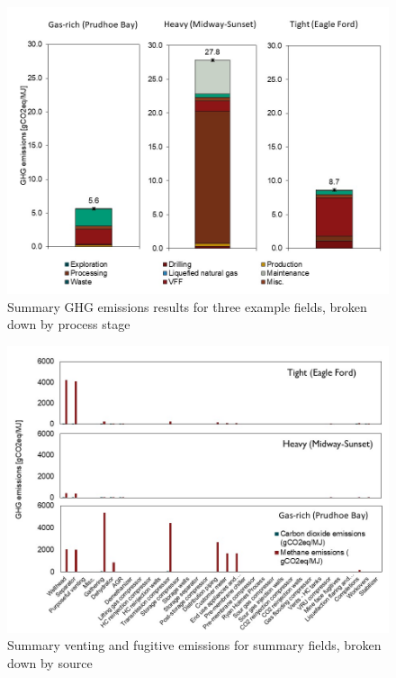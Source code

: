 \documentclass[11pt]{report}
\begin{document}
\begin{figure}[!htbp]
\includegraphics[width=1\columnwidth]{documentation/images/User_Guide_figs/ghgintensity.jpg}
\caption{Summary GHG emissions results for three example fields, broken down by process stage}
\label{fig:example_ghgsummary}
\end{figure}


\begin{figure}[!htbp]
\includegraphics[width=1\columnwidth]{documentation/images/User_Guide_figs/vffsource.jpg}
\caption{Summary venting and fugitive emissions for summary fields, broken down by source}
\label{fig:example_vffsummary}
\end{figure}
\end{document}
